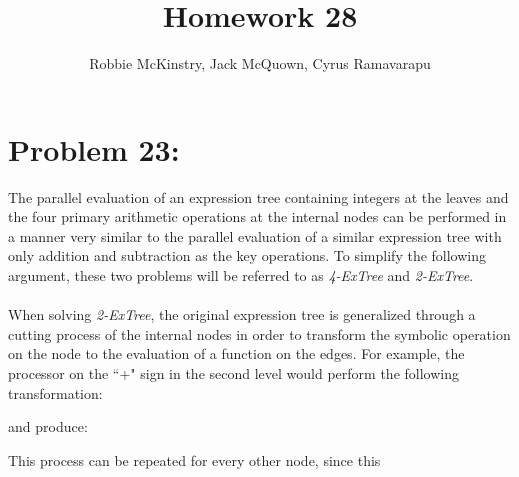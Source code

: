 \documentclass[12pt]{article}
\begin{document}
\title{Homework 28}
\author{Robbie McKinstry, Jack McQuown, Cyrus Ramavarapu}
\renewcommand{\today}{7 November 2016}
\renewcommand{\baselinestretch}{1.5}
\maketitle

\section*{Problem 23: }
The parallel evaluation of an expression tree containing
integers at the leaves and the four primary arithmetic 
operations at the internal nodes can be performed in
a manner very similar to the parallel evaluation of a
similar expression tree with only addition and subtraction
as the key operations.  To simplify the following argument,
these two problems will be referred to as \textit{4-ExTree}
and \textit{2-ExTree}.\\\\
When solving \textit{2-ExTree}, the original expression tree
is generalized through a cutting process of the internal nodes
in order to transform the symbolic operation on the node to
the evaluation of a function on the edges. For example,
the processor on the ``+" sign in the second level would
perform the following transformation:
\begin{center}
\end{center}
and produce:
\begin{center}
\end{center}
This process can be repeated for every other node, since this
\end{document}
